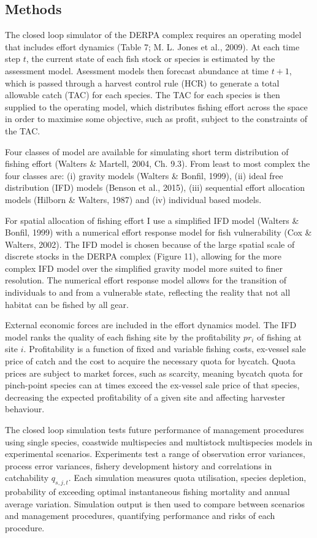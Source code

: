 \documentclass[12pt,]{scrartcl}
\begin{document}
\subsection{Methods}\label{methods-2}

The closed loop simulator of the DERPA complex requires an operating
model that includes effort dynamics (Table 7; M. L. Jones et al., 2009).
At each time step \(t\), the current state of each fish stock or species
is estimated by the assessment model. Asessment models then forecast
abundance at time \(t+1\), which is passed through a harvest control
rule (HCR) to generate a total allowable catch (TAC) for each species.
The TAC for each species is then supplied to the operating model, which
distributes fishing effort across the space in order to maximise some
objective, such as profit, subject to the constraints of the TAC.

Four classes of model are available for simulating short term
distribution of fishing effort (Walters \& Martell, 2004, Ch. 9.3). From
least to most complex the four classes are: (i) gravity models (Walters
\& Bonfil, 1999), (ii) ideal free distribution (IFD) models (Benson et
al., 2015), (iii) sequential effort allocation models (Hilborn \&
Walters, 1987) and (iv) individual based models.

For spatial allocation of fishing effort I use a simplified IFD model
(Walters \& Bonfil, 1999) with a numerical effort response model for
fish vulnerability (Cox \& Walters, 2002). The IFD model is chosen
because of the large spatial scale of discrete stocks in the DERPA
complex (Figure 11), allowing for the more complex IFD model over the
simplified gravity model more suited to finer resolution. The numerical
effort response model allows for the transition of individuals to and
from a vulnerable state, reflecting the reality that not all habitat can
be fished by all gear.

External economic forces are included in the effort dynamics model. The
IFD model ranks the quality of each fishing site by the profitability
\(pr_i\) of fishing at site \(i\). Profitability is a function of fixed
and variable fishing costs, ex-vessel sale price of catch and the cost
to acquire the necessary quota for bycatch. Quota prices are subject to
market forces, such as scarcity, meaning bycatch quota for pinch-point
species can at times exceed the ex-vessel sale price of that species,
decreasing the expected profitability of a given site and affecting
harvester behaviour.

The closed loop simulation tests future performance of management
procedures using single species, coastwide multispecies and multistock
multispecies models in experimental scenarios. Experiments test a range
of observation error variances, process error variances, fishery
development history and correlations in catchability \(q_{s,j,t}\). Each
simulation measures quota utilisation, species depletion, probability of
exceeding optimal instantaneous fishing mortality and annual average
variation. Simulation output is then used to compare between scenarios
and management procedures, quantifying performance and risks of each
procedure.
\end{document}
